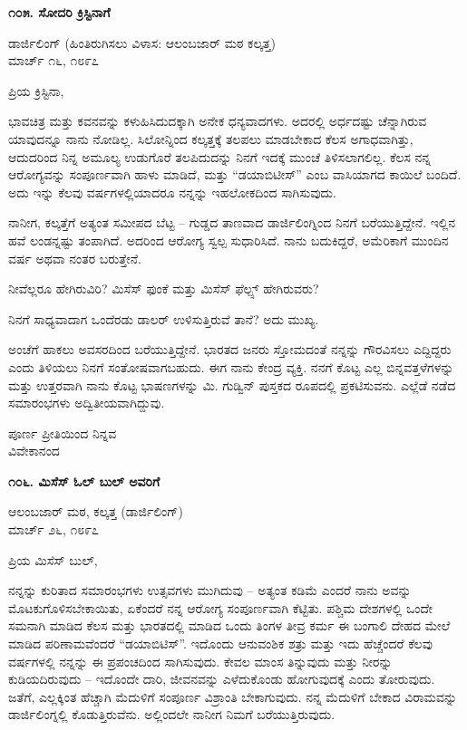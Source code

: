 \begin{center}
\textbf{೧೦೫. ಸೋದರಿ ಕ್ರಿಸ್ಟಿನಾಗೆ}
\end{center}

\begin{flushright}
ಡಾರ್ಜಿಲಿಂಗ್ (ಹಿಂತಿರುಗಿಸಲು ವಿಳಾಸ: ಆಲಂಬಜಾರ್ ಮಠ ಕಲ್ಕತ್ತ)\\ಮಾರ್ಚ್ ೧೬, ೧೮೯೭
\end{flushright}

ಪ್ರಿಯ ಕ್ರಿಸ್ಟಿನಾ,

ಭಾವಚಿತ್ರ ಮತ್ತು ಕವನವನ್ನು ಕಳುಹಿಸಿದುದಕ್ಕಾಗಿ ಅನೇಕ ಧನ್ಯವಾದಗಳು. ಅದರಲ್ಲಿ ಅರ್ಧದಷ್ಟು ಚೆನ್ನಾಗಿರುವ ಯಾವುದನ್ನೂ ನಾನು ನೋಡಿಲ್ಲ. ಸಿಲೋನ್ನಿಂದ ಕಲ್ಕತ್ತಕ್ಕೆ ತಲಪಲು ಮಾಡಬೇಕಾದ ಕೆಲಸ ಅಗಾಧವಾಗಿತ್ತು, ಆದುದರಿಂದ ನಿನ್ನ ಅಮೂಲ್ಯ ಉಡುಗೊರೆ ತಲಪಿದುದನ್ನು ನಿನಗೆ ಇದಕ್ಕೆ ಮುಂಚೆ ತಿಳಿಸಲಾಗಲಿಲ್ಲ. ಕೆಲಸ ನನ್ನ ಆರೋಗ್ಯವನ್ನು ಸಂಪೂರ್ಣವಾಗಿ ಹಾಳು ಮಾಡಿದೆ, ಮತ್ತು “ಡಯಾಬಿಟೀಸ್” ಎಂಬ ವಾಸಿಯಾಗದ ಕಾಯಿಲೆ ಬಂದಿದೆ. ಅದು ಇನ್ನು ಕೆಲವು ವರ್ಷಗಳಲ್ಲಿಯಾದರೂ ನನ್ನನ್ನು ಇಹಲೋಕದಿಂದ ಸಾಗಿಸುವುದು.

ನಾನೀಗ, ಕಲ್ಕತ್ತೆಗೆ ಅತ್ಯಂತ ಸಮೀಪದ ಬೆಟ್ಟ – ಗುಡ್ಡದ ತಾಣವಾದ ಡಾರ್ಜಿಲಿಂಗ್ನಿಂದ ನಿನಗೆ ಬರೆಯುತ್ತಿದ್ದೇನೆ. ಇಲ್ಲಿನ ಹವೆ ಲಂಡನ್ನಷ್ಟು ತಂಪಾಗಿದೆ. ಅದರಿಂದ ಆರೋಗ್ಯ ಸ್ವಲ್ಪ ಸುಧಾರಿಸಿದೆ. ನಾನು ಬದುಕಿದ್ದರೆ, ಅಮೆರಿಕಾಗೆ ಮುಂದಿನ ವರ್ಷ ಅಥವಾ ನಂತರ ಬರುತ್ತೇನೆ.

ನೀವೆಲ್ಲರೂ ಹೇಗಿರುವಿರಿ? ಮಿಸೆಸ್ ಫುಂಕೆ ಮತ್ತು ಮಿಸೆಸ್ ಫೆಲ್ಪ್ಸ್ ಹೇಗಿರುವರು?

ನಿನಗೆ ಸಾಧ್ಯವಾದಾಗ ಒಂದೆರಡು ಡಾಲರ್ ಉಳಿಸುತ್ತಿರುವೆ ತಾನೆ? ಅದು ಮುಖ್ಯ.

ಅಂಚೆಗೆ ಹಾಕಲು ಅವಸರದಿಂದ ಬರೆಯುತ್ತಿದ್ದೇನೆ. ಭಾರತದ ಜನರು ಸ್ತೋಮದಂತೆ ನನ್ನನ್ನು ಗೌರವಿಸಲು ಎದ್ದಿದ್ದರು ಎಂದು ತಿಳಿಯಲು ನಿನಗೆ ಸಂತೋಷವಾಗಬಹುದು. ಈಗ ನಾನು ಕೇಂದ್ರ ವ್ಯಕ್ತಿ. ನನಗೆ ಕೊಟ್ಟ ಎಲ್ಲ ಬಿನ್ನವತ್ತಳೆಗಳನ್ನು ಮತ್ತು ಉತ್ತರವಾಗಿ ನಾನು ಕೊಟ್ಟ ಭಾಷಣಗಳನ್ನು ಮಿ. ಗುಡ್ವಿನ್ ಪುಸ್ತಕದ ರೂಪದಲ್ಲಿ ಪ್ರಕಟಿಸುವನು. ಎಲ್ಲೆಡೆ ನಡೆದ ಸಮಾರಂಭಗಳು ಅದ್ವಿತೀಯವಾಗಿದ್ದುವು.

\begin{flushright}
ಪೂರ್ಣ ಪ್ರೀತಿಯಿಂದ ನಿನ್ನವ\\ವಿವೇಕಾನಂದ
\end{flushright}

\begin{center}
\textbf{೧೦೬. ಮಿಸೆಸ್ ಓಲ್ ಬುಲ್ ಅವರಿಗೆ}
\end{center}

\begin{flushright}
ಆಲಂಬಜಾರ್ ಮಠ, ಕಲ್ಕತ್ತ (ಡಾರ್ಜಿಲಿಂಗ್)\\ಮಾರ್ಚ್ ೨೬, ೧೮೯೭
\end{flushright}

ಪ್ರಿಯ ಮಿಸೆಸ್ ಬುಲ್,

ನನ್ನನ್ನು ಕುರಿತಾದ ಸಮಾರಂಭಗಳು ಉತ್ಸವಗಳು ಮುಗಿದುವು – ಅತ್ಯಂತ ಕಡಿಮೆ ಎಂದರೆ ನಾನು ಅವನ್ನು ಮೊಟಕುಗೊಳಿಸಬೇಕಾಯಿತು, ಏಕೆಂದರೆ ನನ್ನ ಆರೋಗ್ಯ ಸಂಪೂರ್ಣವಾಗಿ ಕೆಟ್ಟಿತು. ಪಶ್ಚಿಮ ದೇಶಗಳಲ್ಲಿ ಒಂದೇ ಸಮನಾಗಿ ಮಾಡಿದ ಕೆಲಸ ಮತ್ತು ಭಾರತದಲ್ಲಿ ಮಾಡಿದ ಒಂದು ತಿಂಗಳ ತೀವ್ರ ಕರ್ಮ ಈ ಬಂಗಾಲಿ ದೇಹದ ಮೇಲೆ ಮಾಡಿದ ಪರಿಣಾಮವೆಂದರೆ “ಡಯಾಬಿಟಿಸ್”. ಇದೊಂದು ಆನುವಂಶಿಕ ಶತ್ರು ಮತ್ತು ಇದು ಹೆಚ್ಚೆಂದರೆ ಕೆಲವು ವರ್ಷಗಳಲ್ಲಿ ನನ್ನನ್ನು ಈ ಪ್ರಪಂಚದಿಂದ ಸಾಗಿಸುವುದು. ಕೇವಲ ಮಾಂಸ ತಿನ್ನುವುದು ಮತ್ತು ನೀರನ್ನು ಕುಡಿಯದಿರುವುದು – ಇದೊಂದೇ ದಾರಿ, ಜೀವನವನ್ನು ಎಳೆದುಕೊಂಡು ಹೋಗುವುದಕ್ಕೆ ಎಂದು ತೋರುವುದು. ಜತೆಗೆ, ಎಲ್ಲಕ್ಕಿಂತ ಹೆಚ್ಚಾಗಿ ಮೆದುಳಿಗೆ ಸಂಪೂರ್ಣ ವಿಶ್ರಾಂತಿ ಬೇಕಾಗುವುದು. ನನ್ನ ಮೆದುಳಿಗೆ ಬೇಕಾದ ವಿರಾಮವನ್ನು ಡಾರ್ಜಿಲಿಂಗ್ನಲ್ಲಿ ಕೊಡುತ್ತಿರುವೆನು. ಅಲ್ಲಿಂದಲೇ ನಾನೀಗ ನಿಮಗೆ ಬರೆಯುತ್ತಿರುವುದು.

